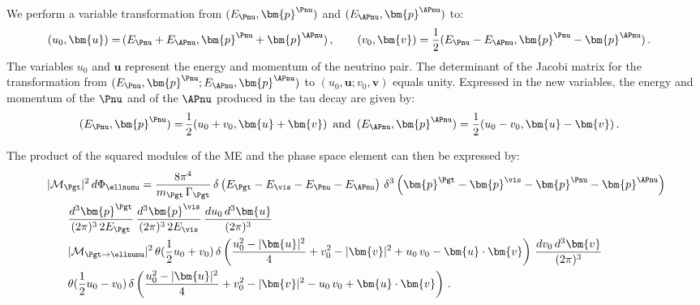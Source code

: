 We perform a variable transformation from $(E_{\Pnu}, \bm{p}^{\Pnu})$
and $(E_{\APnu}, \bm{p}^{\APnu})$ to:
\begin{align}
(u_{0}, \bm{u}) = & \, (E_{\Pnu} + E_{\APnu}, \bm{p}^{\Pnu} +
\bm{p}^{\APnu}) \, , \qquad (v_{0}, \bm{v}) = \frac{1}{2} (
  E_{\Pnu} - E_{\APnu}, \bm{p}^{\Pnu} - \bm{p}^{\APnu} ) \, . \nonumber 
\end{align}
The variables $u_{0}$ and $\bm{u}$ represent the energy and momentum of the neutrino pair.
The determinant of the Jacobi matrix for the transformation from
$(E_{\Pnu}, \bm{p}^{\Pnu}; E_{\APnu}, \bm{p}^{\APnu})$
to $(u_{0}, \bm{u}; v_{0}, \bm{v})$ equals unity.
Expressed in the new variables, the energy and momentum of the
$\Pnu$ and of the $\APnu$ produced in the tau decay are given by:
\begin{align}
( E_{\Pnu}, \bm{p}^{\Pnu} ) = & \, \frac{1}{2} ( u_{0} + v_{0}, \bm{u}
+ \bm{v} ) \, \mbox{ and } \, ( E_{\APnu}, \bm{p}^{\APnu} ) = \frac{1}{2} (
u_{0} - v_{0}, \bm{u} - \bm{v} ) \, . \nonumber 
\end{align}

The product of the squared modules of the ME and the phase space
element can then be expressed by:
\begin{align}
& \, \vert\mathcal{M}_{\Pgt}\vert^{2} \,
 d\Phi_{\ellnunu} = \frac{8\pi^{4}}{m_{\Pgt} \, \Gamma_{\Pgt}} \, \delta \left( E_{\Pgt} - E_{\vis} -
  E_{\Pnu} - E_{\APnu} \right) \, \delta^{3} \left( \bm{p}^{\Pgt} -
  \bm{p}^{\vis} - \bm{p}^{\Pnu} - \bm{p}^{\APnu} \right) \nonumber \\
 & \qquad
\frac{d^{3}\bm{p}^{\Pgt}}{(2\pi)^{3} \, 2 E_{\Pgt}} \,
\frac{d^{3}\bm{p}^{\vis}}{(2\pi)^{3} \, 2 E_{\vis}} \,
\frac{du_{0} \, d^{3}\bm{u}}{(2\pi)^{3}} \nonumber \\
 & \qquad
  \vert\mathcal{M}_{\Pgt \to
  \ellnunu}\vert^{2} \, \theta(\frac{1}{2} u_{0} + v_{0}) \, \delta
\left( \frac{u_{0}^{2} - \vert\bm{u}\vert^{2}}{4} + v_{0}^{2} - \vert\bm{v}\vert^{2} +
  u_{0} \, v_{0} - \bm{u} \cdot \bm{v} \right) \, 
  \frac{dv_{0} \, d^{3}\bm{v}}{(2\pi)^{3}} \nonumber \\
 & \qquad
  \theta(\frac{1}{2} u_{0}
  - v_{0}) \, \delta \left( \frac{u_{0}^{2} - \vert\bm{u}\vert^{2}}{4} +
    v_{0}^{2} - \vert\bm{v}\vert^{2} - u_{0} \, v_{0} + \bm{u}
    \cdot \bm{v} \right) \, .
\label{eq:lepTauDecaysPSint}
\end{align}

